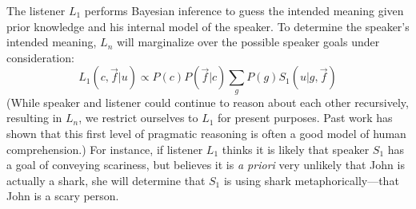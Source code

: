 \documentclass[10pt,letterpaper]{article}
\begin{document}

The listener $L_1$ performs Bayesian inference to guess the intended meaning given prior knowledge and his internal model of the speaker. To determine the speaker's intended meaning, $L_n$ will marginalize over the possible speaker goals under consideration:
$$
L_1 (c, \vec f | u) \propto P(c) P(\vec f | c) \sum_{g}{P (g) S_1 (u|g, \vec f)}
$$
(While speaker and listener could continue to reason about each other recursively, resulting in $L_n$, we restrict ourselves to $L_1$ for present purposes. Past work has shown that this first level of pragmatic reasoning is often a good model of human comprehension.)
For instance, if listener $L_1$ thinks it is likely that speaker $S_1$ has a goal of conveying scariness, but believes it is \emph{a priori} very unlikely that John is actually a shark, she will determine that $S_1$ is using shark metaphorically---that John is a scary person.
\end{document}
